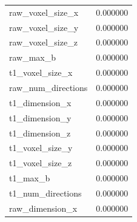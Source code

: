 \documentclass[fleqn,10pt,inline]{wlscirep}
\begin{document}
\begin{appendixbox}
\begin{multicols}{2}
{\begin{tabular}{|lr}
raw\_voxel\_size\_x      &                  0.000000 \\
raw\_voxel\_size\_y      &                  0.000000 \\
raw\_voxel\_size\_z      &                  0.000000 \\
raw\_max\_b             &                  0.000000 \\
t1\_voxel\_size\_x       &                  0.000000 \\
raw\_num\_directions    &                  0.000000 \\
t1\_dimension\_x        &                  0.000000 \\
t1\_dimension\_y        &                  0.000000 \\
t1\_dimension\_z        &                  0.000000 \\
t1\_voxel\_size\_y       &                  0.000000 \\
t1\_voxel\_size\_z       &                  0.000000 \\
t1\_max\_b              &                  0.000000 \\
t1\_num\_directions     &                  0.000000 \\
raw\_dimension\_x       &                  0.000000 \\
\bottomrule
\end{tabular}
}
\end{multicols}
\end{appendixbox}
\end{document}
